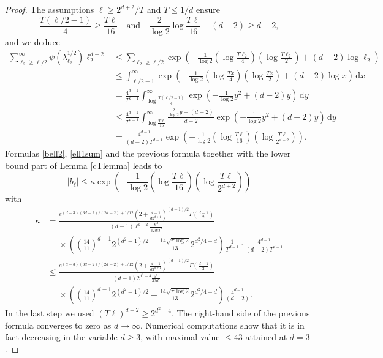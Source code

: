 \documentclass[11pt,a4paper]{article}
\theoremstyle{definition}
\begin{document}
\begin{proof}
The assumptions $\ell \ge 2^{d+2}/T$ and $T \le 1/d$ ensure
\[ \frac{T(\ell/2-1)}{4} \ge \frac{T \ell}{16} \quad \textrm{and} \quad \frac{2}{\log 2} \log \frac{T\ell}{16} - (d-2) \ge d-2, \]
and we deduce
\[ \begin{split} \sum_{\ell_2 \ge \ell/2}^{\infty} \psi (\lambda_{\ell_2}^{1/2}) \ell_2^{d-2} &\le \sum_{\ell_2 \ge \ell/2} \exp \left( - \frac{1}{\log 2} \left( \log \frac{T \ell_2}{4} \right) \left( \log \frac{T \ell_2}{2} \right) + (d-2) \log \ell_2 \right) \\ &\le \int_{\ell/2-1}^{\infty} \exp \left( - \frac{1}{\log 2} \left( \log \frac{Tx}{4} \right) \left( \log \frac{Tx}{2} \right) + (d-2) \log x \right) \, \mathrm{d}x \\ &= \frac{4^{d-1}}{T^{d-1}} \int_{\log \frac{T(\ell/2-1)}{4}}^{\infty} \exp \left( - \frac{1}{\log 2} y^2 + (d-2)y \right) \, \mathrm{d}y \\ &\le \frac{4^{d-1}}{T^{d-1}} \int_{\log \frac{T\ell}{16}}^{\infty} \frac{\frac{2}{\log 2} y - (d-2)}{d-2} \exp \left( - \frac{1}{\log 2} y^2 + (d-2)y \right) \, \mathrm{d}y \\ &= \frac{4^{d-1}}{(d-2)T^{d-1}} \exp \left( - \frac{1}{\log 2} \left( \log \frac{T\ell}{16} \right) \left( \log \frac{T\ell}{2^{d+2}} \right) \right) . \end{split} \]
Formulas \eqref{bell2}, \eqref{ell1sum} and the previous formula together with the lower bound part of Lemma \ref{cTlemma} leads to
\[ |b_{\ell}| \le \kappa \exp \left( - \frac{1}{\log 2} \left( \log \frac{T\ell}{16} \right) \left( \log \frac{T\ell}{2^{d+2}} \right) \right) \]
with
\[ \begin{split} \kappa &= \frac{e^{(d-3)(3d-2)/(2d-2)+1/12} (2+\frac{d-1}{d2^{d+1}})^{(d-1)/2} \Gamma \left( \frac{d-1}{2} \right)}{(d-1)\ell^{d-2} \frac{6^d}{32 d! T^d}} \\ &{\phantom{=}} \times \left( \left( \frac{14}{11} \right)^{d-1} 2^{(d^2-1)/2} + \frac{14 \sqrt{\pi \log 2}}{13} 2^{d^2/4+d} \right) \frac{1}{T^{d-1}} \cdot \frac{4^{d-1}}{(d-2)T^{d-1}} \\ &\le \frac{e^{(d-3)(3d-2)/(2d-2)+1/12} (2+\frac{d-1}{d2^{d+1}})^{(d-1)/2} \Gamma \left( \frac{d-1}{2} \right)}{(d-1) 2^{d^2-4} \frac{6^d}{32 d!}} \\ &{\phantom{=}} \times \left( \left( \frac{14}{11} \right)^{d-1} 2^{(d^2-1)/2} + \frac{14 \sqrt{\pi \log 2}}{13} 2^{d^2/4+d} \right) \frac{4^{d-1}}{(d-2)} . \end{split} \]
In the last step we used $(T\ell)^{d-2} \ge 2^{d^2-4}$. The right-hand side of the previous formula converges to zero as $d \to \infty$. Numerical computations show that it is in fact decreasing in the variable $d \ge 3$, with maximal value $\le 43$ attained at $d=3$.
\end{proof}
\end{document}

